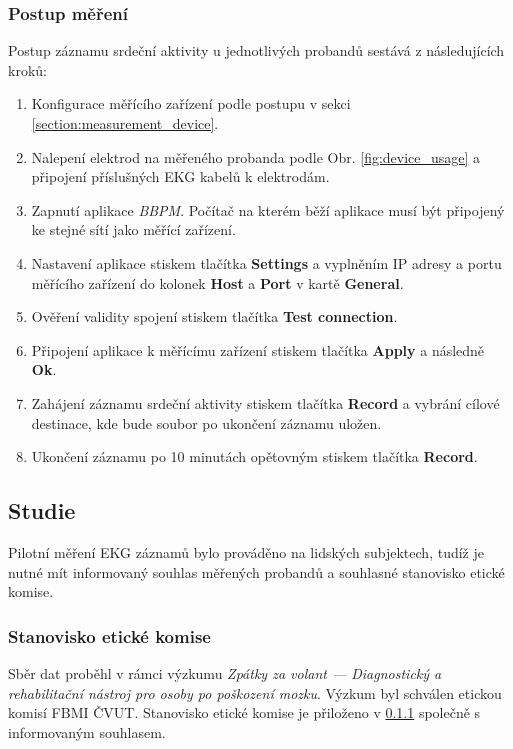\subsubsection{Postup měření}
\label{section:measurement_process}
Postup záznamu srdeční aktivity u jednotlivých probandů sestává z
následujících kroků:
\begin{enumerate}
    \item Konfigurace měřícího zařízení podle postupu v sekci
          \ref{section:measurement_device}.
    \item Nalepení elektrod na měřeného probanda podle Obr.
          \ref{fig:device_usage} a připojení příslušných EKG kabelů k elektrodám.
    \item Zapnutí aplikace \textit{BBPM}. Počítač na kterém běží aplikace musí
          být připojený ke stejné sítí jako měřící zařízení.
    \item Nastavení aplikace stiskem tlačítka \textbf{Settings} a vyplněním IP
          adresy a portu měřícího zařízení do kolonek \textbf{Host} a \textbf{Port} v
          kartě \textbf{General}.
    \item Ověření validity spojení stiskem tlačítka \textbf{Test connection}.
    \item Připojení aplikace k měřícímu zařízení stiskem tlačítka
          \textbf{Apply} a následně \textbf{Ok}.
    \item Zahájení záznamu srdeční aktivity stiskem tlačítka \textbf{Record} a
          vybrání cílové destinace, kde bude soubor po ukončení záznamu uložen.
    \item Ukončení záznamu po 10 minutách opětovným stiskem tlačítka \textbf{Record}.
\end{enumerate}

\subsection{Studie}
\label{section:study}
Pilotní měření EKG záznamů bylo prováděno na lidských subjektech, tudíž je nutné
mít informovaný souhlas měřených probandů a souhlasné stanovisko etické komise.

\subsubsection{Stanovisko etické komise}
Sběr dat proběhl v rámci výzkumu \textit{Zpátky za volant --- Diagnostický a
rehabilitační nástroj pro osoby po poškození mozku}. Výzkum byl schválen etickou
komisí FBMI ČVUT. Stanovisko etické komise je přiloženo v \ref{} společně s
informovaným souhlasem. 

